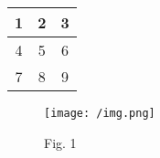 \documentclass{article}
\begin{document}
\begin{tabular}{|c|c|c|}
\hline
1 & 2 & 3 \\
\hline
4 & 5 & 6 \\
\hline
7 & 8 & 9 \\
\hline
\end{tabular}
\begin{figure}[h!]
\centering
\texttt{[image: /img.png]}
\caption{Fig. 1}
\end{figure}
\end{document}
